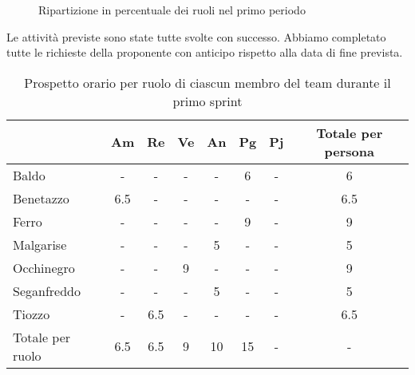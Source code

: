 \newblock
\begin{figure*}
    \centering
    \caption{Ripartizione in percentuale dei ruoli nel primo periodo}
    \label{fig:2}
\end{figure*}

\newblock
\newpage
{}
Le attività previste sono state tutte svolte con successo. Abbiamo completato tutte le richieste della proponente con anticipo rispetto alla data di fine prevista.
\begin{table}[!h]
    \centering
    \begin{tabular}{ | l | c | c | c | c | c | c | c | } 
        \hline
        \textbf{} & \textbf{Am} & \textbf{Re} & \textbf{Ve} &\textbf{An} & \textbf{Pg} & \textbf{Pj} & \textbf{Totale per persona} \\
        \hline 
        Baldo            &  -   &  -   &  -   &  -   &  6   &  -   &  6   \\ 
        Benetazzo        &  6.5 &  -   &  -   &  -   &  -   &  -   &  6.5 \\ 
        Ferro            &  -   &  -   &  -   &  -   &  9   &  -   &  9   \\ 
        Malgarise        &  -   &  -   &  -   &  5   &  -   &  -   &  5   \\ 
        Occhinegro       &  -   &  -   &  9   &  -   &  -   &  -   &  9   \\ 
        Seganfreddo      &  -   &  -   &  -   &  5   &  -   &  -   &  5   \\
        Tiozzo           &  -   &  6.5 &  -   &  -   &  -   &  -   &  6.5 \\ 
        \hline
        Totale per ruolo &  6.5 &  6.5 &  9   & 10   & 15   &  -   &  -   \\
        \hline
    \end{tabular}
    \caption{Prospetto orario per ruolo di ciascun membro del team durante il primo sprint}
    \label{tab:2}
\end{table}

